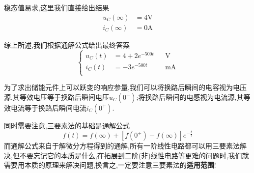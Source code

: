\begin{solution}
\begin{enumerate}
        稳态值易求,这里我们直接给出结果
        \begin{equation}
            \begin{aligned}
                u_C\left( \infty \right) &=4\mathrm{V}\\
                i_C\left( \infty \right) &=0\mathrm{A}
            \end{aligned}
        \end{equation}
    \end{enumerate}
    综上所述,我们根据通解公式给出最终答案
    \begin{equation*}
        \left\{ \begin{aligned}
            u_C\left( t \right) &=4+2e^{-500t}&&\mathrm{V}\\
            i_C\left( t \right) &=-3e^{-500t}&&\mathrm{mA}\\
        \end{aligned} \right.
    \end{equation*}
\end{solution}
\begin{remark}
    为了求出储能元件上可以跃变的响应参量,我们可以将换路后瞬间的电容视为电压源,其等效电压等于换路后瞬间电压$u_C\left( 0^+ \right) $;将换路后瞬间的电感视为电流源,其等效电流等于换路后瞬间电流$i_C\left( 0^+ \right) $.

    \Par 同时需要注意,三要素法的基础是通解公式
    \begin{equation*}
        f\left( t \right) =f\left( \infty \right) +\left[ f\left( 0^+ \right) -f\left( \infty \right) \right] e^{-\frac{t}{\tau}}
    \end{equation*}
    而通解公式来自于解微分方程得到的通解,所有一阶线性电路都可以用三要素法解决,但不要忘记它的本质是什么,在拓展到二阶(非)线性电路等更难的问题时,我们就需要用本质的原理来解决问题,换言之,一定要注意三要素法的\textbf{适用范围}!
\end{remark}
